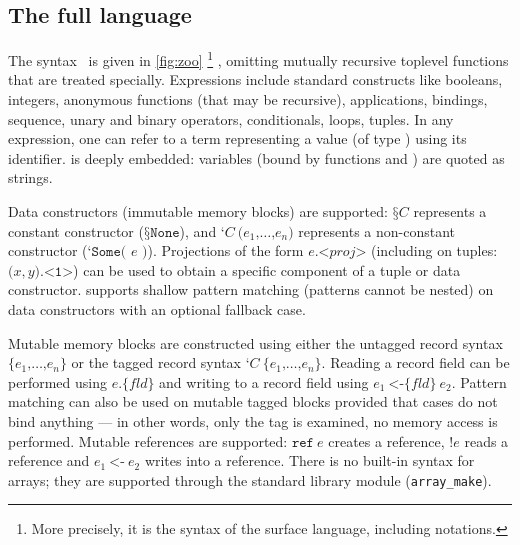 \subsection{The full language}



The \ZooLang syntax~ is given in \cref{fig:zoo}%
\footnote{
More precisely, it is the syntax of the surface language, including \Rocq notations.
}%
, omitting mutually recursive toplevel functions that are treated specially.
Expressions include standard constructs like booleans, integers, anonymous functions (that may be recursive), applications,  bindings, sequence, unary and binary operators, conditionals,  loops, tuples.
In any expression, one can refer to a \Rocq term representing a \ZooLang value (of type ) using its \Rocq identifier.
\ZooLang is deeply embedded: variables (bound by functions and ) are quoted as strings.

Data constructors (immutable memory blocks) are supported: $\texttt{§}C$ represents a constant constructor (\eg $\texttt{§}\texttt{None}$), and $\texttt{‘} C\ \texttt{(} e_1 \texttt{,} \dots \texttt{,} e_n \texttt{)}$ represents a non-constant constructor (\eg $\texttt{‘} \texttt{Some( } e \texttt{ )}$).
Projections of the form $e \texttt{.<} \mathit{proj} \texttt{>}$ (including on tuples: $\texttt{(} x, y \texttt{).<1>}$) can be used to obtain a specific component of a tuple or data constructor.
\ZooLang supports shallow pattern matching (patterns cannot be nested) on data constructors with an optional fallback case.

Mutable memory blocks are constructed using either the untagged record syntax $\texttt{\{} e_1 \texttt{,} \dots \texttt{,} e_n \texttt{\}}$ or the tagged record syntax $\texttt{‘} C\ \texttt{\{} e_1 \texttt{,} \dots \texttt{,} e_n \texttt{\}}$.
Reading a record field can be performed using $e \texttt{.\{} \mathit{fld} \texttt{\}}$ and writing to a record field using $e_1\ \texttt{<-\{} \mathit{fld} \texttt{\}}\ e_2$.
Pattern matching can also be used on mutable tagged blocks provided that cases do not bind anything --- in other words, only the tag is examined, no memory access is performed.
Mutable references are supported: $\texttt{ref}\ e$ creates a reference, $\texttt{!} e$ reads a reference and $e_1\ \texttt{<-}\ e_2$ writes into a reference.
There is no built-in syntax for arrays; they are supported through the  standard library module (\eg \texttt{array\_make}).

